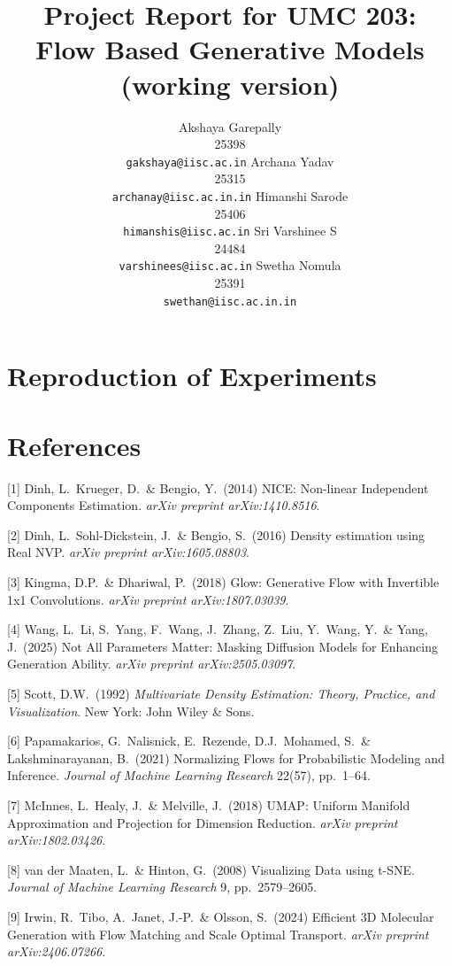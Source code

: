 \documentclass{article}
\title{Project Report for UMC 203: \\
Flow Based Generative Models
(working version)}
\author{%
  Akshaya Garepally \\
  25398 \\
  \texttt{gakshaya@iisc.ac.in}
    \And
  Archana Yadav \\
  25315 \\
  \texttt{archanay@iisc.ac.in.in}
    \And
  Himanshi Sarode \\
  25406\\
  \texttt{himanshis@iisc.ac.in}
  \And
  Sri Varshinee S \\
  24484 \\
  \texttt{varshinees@iisc.ac.in}
  \And
  Swetha Nomula \\
  25391 \\
  \texttt{swethan@iisc.ac.in.in}
}
\begin{document}
\maketitle


\section{Reproduction of Experiments}


\section*{References}


\small

[1] Dinh, L.\ Krueger, D.\ \& Bengio, Y.\ (2014) NICE: Non-linear Independent Components Estimation. {\it arXiv preprint arXiv:1410.8516}.

[2] Dinh, L.\ Sohl-Dickstein, J.\ \& Bengio, S.\ (2016) Density estimation using Real NVP. {\it arXiv preprint arXiv:1605.08803}.

[3] Kingma, D.P.\ \& Dhariwal, P.\ (2018) Glow: Generative Flow with Invertible 1x1 Convolutions. {\it arXiv preprint arXiv:1807.03039}.

[4] Wang, L.\ Li, S.\ Yang, F.\ Wang, J.\ Zhang, Z.\ Liu, Y.\ Wang, Y.\ \& Yang, J.\ (2025) Not All Parameters Matter: Masking Diffusion Models for Enhancing Generation Ability. {\it arXiv preprint arXiv:2505.03097}.

[5] Scott, D.W.\ (1992) {\it Multivariate Density Estimation: Theory, Practice, and Visualization}. New York: John Wiley \& Sons.

[6] Papamakarios, G.\ Nalisnick, E.\ Rezende, D.J.\ Mohamed, S.\ \& Lakshminarayanan, B.\ (2021) Normalizing Flows for Probabilistic Modeling and Inference. {\it Journal of Machine Learning Research} 22(57), pp.\ 1--64.

[7] McInnes, L.\ Healy, J.\ \& Melville, J.\ (2018) UMAP: Uniform Manifold Approximation and Projection for Dimension Reduction. {\it arXiv preprint arXiv:1802.03426}.

[8] van der Maaten, L.\ \& Hinton, G.\ (2008) Visualizing Data using t-SNE. {\it Journal of Machine Learning Research} 9, pp.\ 2579--2605.

[9] Irwin, R.\ Tibo, A.\ Janet, J.-P.\ \& Olsson, S.\ (2024) Efficient 3D Molecular Generation with Flow Matching and Scale Optimal Transport. {\it arXiv preprint arXiv:2406.07266}.
\end{document}

